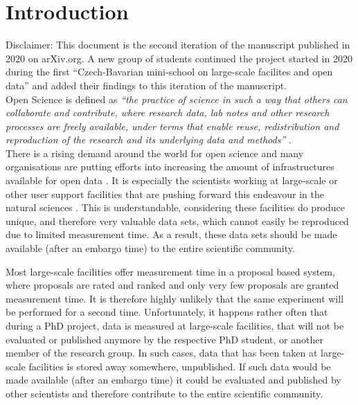 \documentclass[aps,pra,reprint,amsmath,amssymb,superscriptaddress,showkeys]{revtex4-1}
\begin{document}
\section{Introduction}

Disclaimer: This document is the second iteration of the manuscript published in 2020 on arXiv.org\cite{minischool2020}.
A new group of students continued the project started in 2020 during the first ``Czech-Bavarian mini-school on large-scale facilites and open data'' and added their findings to this iteration of the manuscript.\\

Open Science is defined as \emph{``the practice of science in such a way that others can collaborate and contribute, where research data, lab notes and other research processes are freely available, under terms that enable reuse, redistribution and reproduction of the research and its underlying data and methods''} \cite{foster}.\\

There is a rising demand around the world for open science and many organisations are putting efforts into increasing the amount of infrastructures available for open data \cite{Bilbao, NIST, plos, sharing, panosc, nfdi, expands}. 
It is especially the scientists working at large-scale or other user support facilities that are pushing forward this endeavour in the natural sciences \cite{panosc, nfdi, expands}.
This is understandable, considering these facilities do produce unique, and therefore very valuable data sets, which cannot easily be reproduced due to limited measurement time. As a result, these data sets should be made available (after an embargo time) to the entire scientific community. 

Most large-scale facilities offer measurement time in a proposal based system, where proposals are rated and ranked and only very few proposals are granted measurement time.
It is therefore highly unlikely that the same experiment will be performed for a second time. 
Unfortunately, it happens rather often that during a PhD project, data is measured at large-scale facilities, that will not be evaluated or published anymore by the respective PhD student, or another member of the research group.
In such cases, data that has been taken at large-scale facilities is stored away somewhere, unpublished.
If such data would be made available (after an embargo time) it could be evaluated and published by other scientists and therefore contribute to the entire scientific community.
\end{document}
